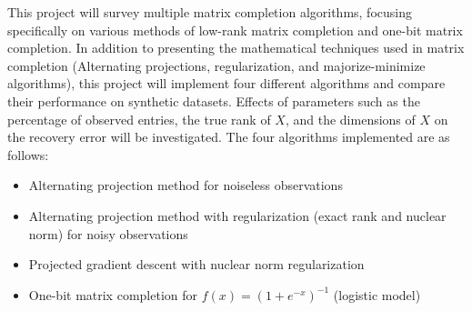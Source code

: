 This project will survey multiple matrix completion algorithms, focusing specifically on various methods of low-rank matrix completion and one-bit matrix completion. In addition to presenting the mathematical techniques used in matrix completion (Alternating projections, regularization, and majorize-minimize algorithms), this project will implement four different algorithms and compare their performance on synthetic datasets. Effects of parameters such as the percentage of observed entries, the true rank of $X$, and the dimensions of $X$ on the recovery error will be investigated. The four algorithms implemented are as follows:
\begin{itemize}
    \item Alternating projection method for noiseless observations 
    \item Alternating projection method with regularization (exact rank and nuclear norm) for noisy observations 
    \item Projected gradient descent with nuclear norm regularization 
    \item One-bit matrix completion for $f(x) = (1 + e^{-x})^{-1}$ (logistic model)
\end{itemize}
